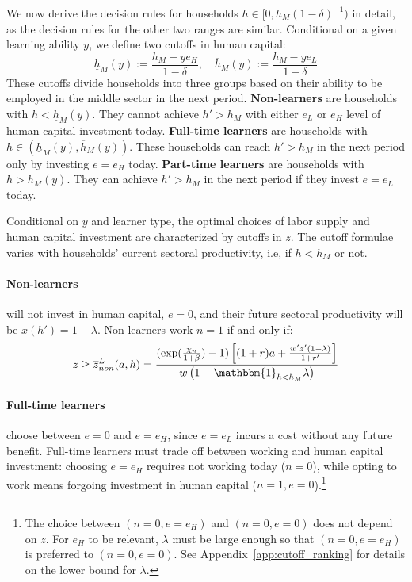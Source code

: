\documentclass[12pt]{article}
\begin{document}
\bigskip
\noindent
We now derive the decision rules for households $h\in[0,h_M(1-\delta)^{-1})$ in detail, as the decision rules for the other two ranges are similar.
Conditional on a given learning ability $y$, we define two cutoffs in human capital:
\begin{equation}\label{eq:hm}
    \underline{h}_M(y):=\frac{h_M-ye_H}{1-\delta}, \quad\overline{h}_M(y):=\frac{h_M-ye_L}{1-\delta} 
\end{equation}
These cutoffs divide households into three groups based on their ability to be employed in the middle sector in the next period. 
\textbf{Non-learners} are households with $h < \underline{h}_M(y)$. They cannot achieve $h' > h_M$ with either $e_L$ or $e_H$ level of human capital investment today. \textbf{Full-time learners} are households with $h \in (\underline{h}_M(y), \overline{h}_M(y))$. These households can reach $h' > h_M$ in the next period only by investing $e = e_H$ today. \textbf{Part-time learners} are households with $h > \overline{h}_M(y)$. They can achieve $h' > h_M$ in the next period if they invest $e = e_L$ today. 


Conditional on $y$ and learner type, the optimal choices of labor supply and human capital investment are characterized by cutoffs in $z$. The cutoff formulae varies with households' current sectoral productivity, i.e, if $h<h_M$ or not. 


\paragraph{Non-learners} will not invest in human capital, $e=0$, and their future sectoral productivity will be $x(h')=1-\lambda$. Non-learners work $n=1$ if and only if:
\begin{equation}
    z\geq\overline{z}^L_{non}(a,h)=\frac{(\exp(\frac{\chi_n}{1+\beta})-1)\left[(1+r)a+\frac{w'z'(1-\lambda)}{1+r'}\right]}{w\left(1-\mathbbm{1}_{h < h_M}\lambda\right)}  \label{eq:z-non}
\end{equation}

\paragraph{Full-time learners} choose between $e=0$ and $e=e_H$, since $e=e_L$ incurs a cost without any future benefit. Full-time learners must trade off between working and human capital investment: choosing $e=e_H$ requires not working today ($n=0$), while opting to work means forgoing investment in human capital ($n=1, e=0$).\footnote{The choice between $(n=0,e=e_H)$ and $(n=0,e=0)$ does not depend on $z$. For $e_H$ to be relevant, $\lambda$ must be large enough so that $(n=0,e=e_H)$ is preferred to $(n=0,e=0)$. See Appendix~\ref{app:cutoff_ranking} for details on the lower bound for $\lambda$.}
\end{document}
